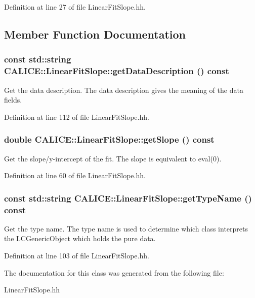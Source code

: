Definition at line 27 of file LinearFitSlope.hh.

\subsection{Member Function Documentation}
\subsubsection[{getDataDescription}]{\setlength{\rightskip}{0pt plus 5cm}const std::string CALICE::LinearFitSlope::getDataDescription () const\hspace{0.3cm}{\ttfamily  [inline]}}\label{classCALICE_1_1LinearFitSlope_a46800ea9d0356523b21f8442f84b2780}


Get the data description. The data description gives the meaning of the data fields. 

Definition at line 112 of file LinearFitSlope.hh.
\subsubsection[{getSlope}]{\setlength{\rightskip}{0pt plus 5cm}double CALICE::LinearFitSlope::getSlope () const\hspace{0.3cm}{\ttfamily  [inline]}}\label{classCALICE_1_1LinearFitSlope_a6647803adff8207d96d9c3990c4254f4}


Get the slope/y-\/intercept of the fit. The slope is equivalent to eval(0). 

Definition at line 60 of file LinearFitSlope.hh.
\subsubsection[{getTypeName}]{\setlength{\rightskip}{0pt plus 5cm}const std::string CALICE::LinearFitSlope::getTypeName () const\hspace{0.3cm}{\ttfamily  [inline]}}\label{classCALICE_1_1LinearFitSlope_acead1fa7eff10fa3d589a79410c14f67}


Get the type name. The type name is used to determine which class interprets the LCGenericObject which holds the pure data. 

Definition at line 103 of file LinearFitSlope.hh.

The documentation for this class was generated from the following file:\begin{DoxyCompactItemize}
\item 
LinearFitSlope.hh\end{DoxyCompactItemize}
